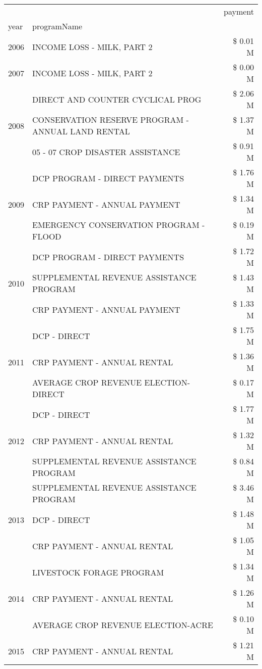 \begin{tabular}{llr}
\toprule
 &  & payment \\
year & programName &  \\
\midrule
2006 & INCOME LOSS - MILK, PART 2 & \$ 0.01 M \\
\cline{1-3}
2007 & INCOME LOSS - MILK, PART 2 & \$ 0.00 M \\
\cline{1-3}
\multirow[t]{3}{*}{2008} & DIRECT AND COUNTER CYCLICAL PROG & \$ 2.06 M \\
 & CONSERVATION RESERVE PROGRAM - ANNUAL LAND RENTAL & \$ 1.37 M \\
 & 05 - 07 CROP DISASTER ASSISTANCE & \$ 0.91 M \\
\cline{1-3}
\multirow[t]{3}{*}{2009} & DCP PROGRAM - DIRECT PAYMENTS & \$ 1.76 M \\
 & CRP PAYMENT - ANNUAL PAYMENT & \$ 1.34 M \\
 & EMERGENCY CONSERVATION PROGRAM - FLOOD & \$ 0.19 M \\
\cline{1-3}
\multirow[t]{3}{*}{2010} & DCP PROGRAM - DIRECT PAYMENTS & \$ 1.72 M \\
 & SUPPLEMENTAL REVENUE ASSISTANCE PROGRAM & \$ 1.43 M \\
 & CRP PAYMENT - ANNUAL PAYMENT & \$ 1.33 M \\
\cline{1-3}
\multirow[t]{3}{*}{2011} & DCP - DIRECT & \$ 1.75 M \\
 & CRP PAYMENT - ANNUAL RENTAL & \$ 1.36 M \\
 & AVERAGE CROP REVENUE ELECTION-DIRECT & \$ 0.17 M \\
\cline{1-3}
\multirow[t]{3}{*}{2012} & DCP - DIRECT & \$ 1.77 M \\
 & CRP PAYMENT - ANNUAL RENTAL & \$ 1.32 M \\
 & SUPPLEMENTAL REVENUE ASSISTANCE PROGRAM & \$ 0.84 M \\
\cline{1-3}
\multirow[t]{3}{*}{2013} & SUPPLEMENTAL REVENUE ASSISTANCE PROGRAM & \$ 3.46 M \\
 & DCP - DIRECT & \$ 1.48 M \\
 & CRP PAYMENT - ANNUAL RENTAL & \$ 1.05 M \\
\cline{1-3}
\multirow[t]{3}{*}{2014} & LIVESTOCK FORAGE PROGRAM & \$ 1.34 M \\
 & CRP PAYMENT - ANNUAL RENTAL & \$ 1.26 M \\
 & AVERAGE CROP REVENUE ELECTION-ACRE & \$ 0.10 M \\
\cline{1-3}
\multirow[t]{2}{*}{2015} & CRP PAYMENT - ANNUAL RENTAL & \$ 1.21 M \\

\end{tabular}
